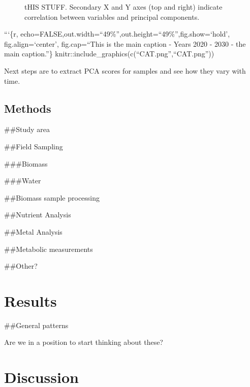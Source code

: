 \documentclass[
]{article}
\begin{document}
\begin{figure}
{}

\caption[tHIS STUFF]{tHIS STUFF. Secondary X and Y axes (top and right) indicate correlation between variables and principal components.}\label{fig:unnamed-chunk-15}
\end{figure}

\FloatBarrier

```\{r,
echo=FALSE,out.width=``49\%'',out.height=``49\%'',fig.show=`hold',
fig.align=`center', fig.cap=``This is the main caption - Years 2020 -
2030 - the main caption.''\}
knitr::include\_graphics(c(``CAT.png'',``CAT.png''))

\newpage

Next steps are to extract PCA scores for samples and see how they vary
with time.

\hypertarget{methods}{%
\subsection{Methods}\label{methods}}

\#\#Study area

\#\#Field Sampling

\#\#\#Biomass

\#\#\#Water

\#\#Biomass sample processing

\#\#Nutrient Analysis

\#\#Metal Analysis

\#\#Metabolic measurements

\#\#Other?

\hypertarget{results}{%
\section{Results}\label{results}}

\#\#General patterns

Are we in a position to start thinking about these?

\hypertarget{discussion}{%
\section{Discussion}\label{discussion}}
\end{document}
